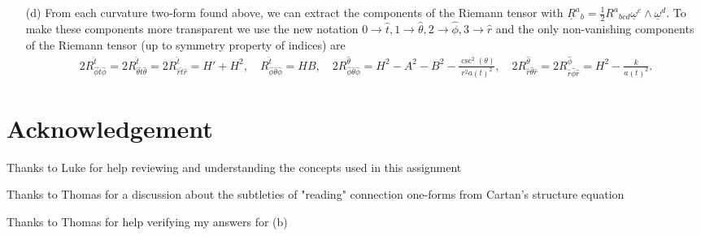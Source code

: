 \documentclass[10pt, a4paper]{article}
\begin{document}
{\begin{enumerate}
  \newpage
  \item[(d)] From each curvature two-form found above, we can extract the components of the Riemann tensor with $\underline{R}^{a}{ }_{b}=\frac{1}{2} R^{a}{ }_{bcd} \underline{\omega}^{c} \wedge \underline{\omega}^{d}$. To make these components more transparent we use the new notation $0 \to \hat{t}, 1 \to \hat{\theta}, 2 \to \hat{\phi}, 3 \to \hat{r}$ and the only non-vanishing components of the Riemann tensor (up to symmetry property of indices) are 
  \begin{align*}
    2R^{\hat{t}}_{\hat{\phi} \hat{t} \hat{\phi}} =  2R^{\hat{t}}_{\hat{\theta} \hat{t} \hat{\theta}} = 2R^{\hat{t}}_{\hat{r} \hat{t} \hat{r}} = H' + H^2, \quad R^{\hat{t}}_{\hat{\phi} \hat{\theta} \hat{\phi}} = HB, \quad  2R^{\hat{\theta}}_{\hat{\phi} \hat{\theta} \hat{\phi}} = H^2-A^2 -B^2 -\frac{\csc^2(\theta)}{r^2 a(t)^2},\quad  2R^{\hat{\theta}}_{\hat{r} \hat{\theta}\hat{r}} = 2R^{\hat{\phi}}_{\hat{r} \hat{\phi}\hat{r}} = H^2-\frac{k}{a(t)^2}.
  \end{align*}
\end{enumerate}

\section{Acknowledgement}

Thanks to Luke for help reviewing and understanding the concepts used in this assignment

Thanks to Thomas for a discussion about the subtleties of "reading" connection one-forms from Cartan's structure equation

Thanks to Thomas for help verifying my answers for (b)


}

\makereferences


\end{document}
